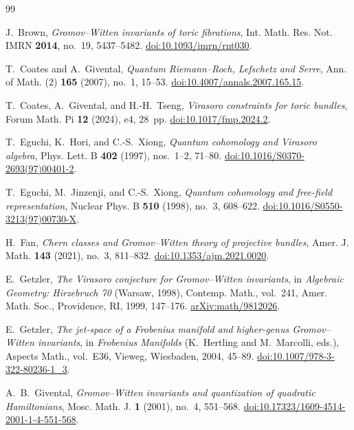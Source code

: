 \begin{thebibliography}{99}

J.~Brown,
\emph{Gromov--Witten invariants of toric fibrations},
Int. Math. Res. Not. IMRN \textbf{2014}, no.~19, 5437--5482.
\href{https://doi.org/10.1093/imrn/rnt030}{doi:10.1093/imrn/rnt030}.

T.~Coates and A.~Givental,
\emph{Quantum Riemann--Roch, Lefschetz and Serre},
Ann. of Math. (2) \textbf{165} (2007), no.~1, 15--53.
\href{https://doi.org/10.4007/annals.2007.165.15}{doi:10.4007/annals.2007.165.15}.

T.~Coates, A.~Givental, and H.-H.~Tseng,
\emph{Virasoro constraints for toric bundles},
Forum Math. Pi \textbf{12} (2024), e4, 28~pp.
\href{https://doi.org/10.1017/fmp.2024.2}{doi:10.1017/fmp.2024.2}.

T.~Eguchi, K.~Hori, and C.-S.~Xiong,
\emph{Quantum cohomology and Virasoro algebra},
Phys. Lett. B \textbf{402} (1997), nos.~1--2, 71--80.
\href{https://doi.org/10.1016/S0370-2693(97)00401-2}{doi:10.1016/S0370-2693(97)00401-2}.

T.~Eguchi, M.~Jinzenji, and C.-S.~Xiong,
\emph{Quantum cohomology and free-field representation},
Nuclear Phys. B \textbf{510} (1998), no.~3, 608--622.
\href{https://doi.org/10.1016/S0550-3213(97)00730-X}{doi:10.1016/S0550-3213(97)00730-X}.

H.~Fan,
\emph{Chern classes and Gromov--Witten theory of projective bundles},
Amer. J. Math. \textbf{143} (2021), no.~3, 811--832.
\href{https://doi.org/10.1353/ajm.2021.0020}{doi:10.1353/ajm.2021.0020}.

E.~Getzler,
\emph{The Virasoro conjecture for Gromov--Witten invariants},
in \emph{Algebraic Geometry: Hirzebruch 70} (Warsaw, 1998),
Contemp. Math., vol.~241, Amer. Math. Soc., Providence, RI, 1999,
147--176.
\href{https://arxiv.org/abs/math/9812026}{arXiv:math/9812026}.

E.~Getzler,
\emph{The jet-space of a Frobenius manifold and higher-genus
Gromov--Witten invariants},
in \emph{Frobenius Manifolds} (K.~Hertling and M.~Marcolli, eds.),
Aspects Math., vol.~E36, Vieweg, Wiesbaden, 2004, 45--89.
\href{https://doi.org/10.1007/978-3-322-80236-1_3}{doi:10.1007/978-3-322-80236-1\_3}.

A.~B.~Givental,
\emph{Gromov--Witten invariants and quantization of quadratic Hamiltonians},
Mosc. Math. J. \textbf{1} (2001), no.~4, 551--568.
\href{https://doi.org/10.17323/1609-4514-2001-1-4-551-568}{doi:10.17323/1609-4514-2001-1-4-551-568}.


\end{thebibliography}
